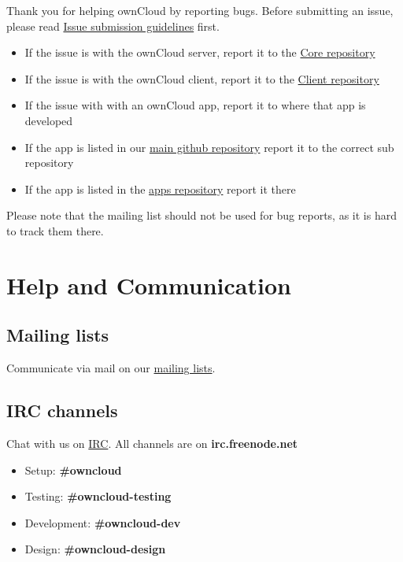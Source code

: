 \documentclass[letterpaper,10pt,english]{sphinxmanual}
\begin{document}
Thank you for helping ownCloud by reporting bugs. Before submitting an issue, please read
\href{https://github.com/owncloud/core/blob/master/.github/CONTRIBUTING.md\#submitting-issues}{Issue submission guidelines} first.
\begin{itemize}
\item {} 
If the issue is with the ownCloud server, report it to the \href{https://github.com/owncloud/core/issues}{Core repository}

\item {} 
If the issue is with the ownCloud client, report it to the \href{https://github.com/owncloud/client/issues}{Client repository}

\item {} 
If the issue with with an ownCloud app, report it to where that app is developed

\item {} 
If the app is listed in our \href{https://github.com/owncloud}{main github repository} report it to the correct sub
repository

\item {} 
If the app is listed in the \href{https://github.com/owncloud/apps/issues}{apps repository} report it there

\end{itemize}

Please note that the mailing list should not be used for bug reports, as it is hard to track them there.


\section{Help and Communication}
\label{commun/index:help-and-communication}\label{commun/index::doc}\label{commun/index:apps-repository}

\subsection{Mailing lists}
\label{commun/index:mailing-lists}
Communicate via mail on our \href{https://mailman.owncloud.org}{mailing lists}.


\subsection{IRC channels}
\label{commun/index:irc-channels}
Chat with us on \href{http://www.irchelp.org/}{IRC}. All channels are on \textbf{irc.freenode.net}
\begin{itemize}
\item {} 
Setup: \textbf{\#owncloud}

\item {} 
Testing: \textbf{\#owncloud-testing}

\item {} 
Development: \textbf{\#owncloud-dev}

\item {} 
Design: \textbf{\#owncloud-design}

\end{itemize}
\end{document}
